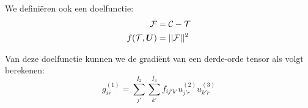 We defini\"eren ook een doelfunctie:
\begin{align*}
    \mathcal{F} &= \mathcal{C} - \mathcal{T}\\
    f(\mathcal{T}, \boldsymbol{U}) &= ||\mathcal{F}||^2
\end{align*}

Van deze doelfunctie kunnen we de gradi\"ent van een derde-orde tensor als volgt berekenen:
\[
    g^{(1)}_{ir} =\sum_{j'}^{I_2}\sum_{k'}^{I_3} f_{ij'k'} u^{(2)}_{j'r} u^{(3)}_{k'r}
\]